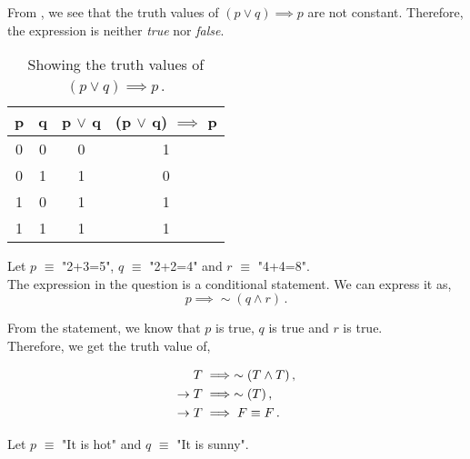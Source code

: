\begin{subquestions}
\begin{subsubquestions}
From , we see that the truth values of $(p \lor q) \implies p$ are not constant. Therefore, the expression is neither \textit{true} nor \textit{false}.

\begin{table}[ht]
	\centering
	\begin{tabular}{|c|c|c|c|}
		\hline
		p & q & p $\lor$ q & (p $\lor$ q) $\implies$ p \\
		\hline
		0 & 0 & 0 & 1 \\
		0 & 1 & 1 & 0 \\
		1 & 0 & 1 & 1 \\
		1 & 1 & 1 & 1 \\
		\hline
	\end{tabular}
	\caption{\label{2012:q2:TruthTab2} Showing the truth values of $(p \lor q) \implies p$\,.}
\end{table}
\end{subsubquestions}


\subquestion

Let $p$ $\equiv$ "2+3=5", $q$ $\equiv$ "2+2=4" and $r$ $\equiv$ "4+4=8". \\	
The expression in the question is a conditional statement. We can express it as, 
\begin{equation}
	p \implies \sim (q \land r)\,.
\end{equation}

From the statement, we know that $p$ is true, $q$ is true and $r$ is true. \\
Therefore, we get the truth value of,

\begin{align}
	T & \implies \sim(T \land T)\,, \nonumber \\
	\rightarrow T & \implies \sim(T)\,, \nonumber \\
	\rightarrow T & \implies F \equiv F\,.
\end{align}


\subquestion

\begin{subsubquestions}
	
\subsubquestion
Let $p$ $\equiv$ "It is hot" and $q$ $\equiv$ "It is sunny". \\


\end{subsubquestions}
\end{subquestions}
